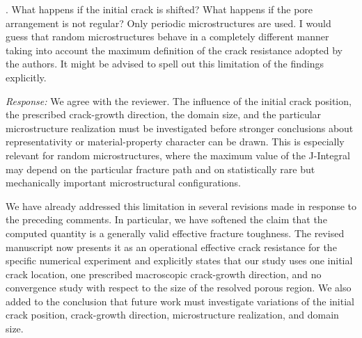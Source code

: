 \documentclass[pdflatex,sn-mathphys-num]{sn-jnl}
\begin{document}
\bigskip

. What happens if the initial crack is shifted? What happens if the pore arrangement is not regular? Only periodic microstructures are used. I would guess that random microstructures behave in a completely different manner taking into account the maximum definition of the crack resistance adopted by the authors. It might be advised to spell out this limitation of the findings explicitly.

\emph{Response:} We agree with the reviewer. The influence of the initial crack position, the prescribed crack-growth direction, the domain size, and the particular microstructure realization must be investigated before stronger conclusions about representativity or material-property character can be drawn. This is especially relevant for random microstructures, where the maximum value of the J-Integral may depend on the particular fracture path and on statistically rare but mechanically important microstructural configurations.

We have already addressed this limitation in several revisions made in response to the preceding comments. In particular, we have softened the claim that the computed quantity is a generally valid effective fracture toughness. The revised manuscript now presents it as an operational effective crack resistance for the specific numerical experiment and explicitly states that our study uses one initial crack location, one prescribed macroscopic crack-growth direction, and no convergence study with respect to the size of the resolved porous region. We also added to the conclusion that future work must investigate variations of the initial crack position, crack-growth direction, microstructure realization, and domain size.
\end{document}
